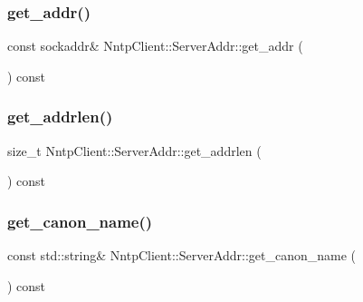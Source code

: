 \subsubsection{\texorpdfstring{get\+\_\+addr()}{get\_addr()}}
{\footnotesize\ttfamily const sockaddr\& Nntp\+Client\+::\+Server\+Addr\+::get\+\_\+addr (\begin{DoxyParamCaption}{ }\end{DoxyParamCaption}) const\hspace{0.3cm}{\ttfamily [inline]}}

\hypertarget{class_nntp_client_1_1_server_addr_ac0737342c3b56311c50e1bf420d82904}{}\label{class_nntp_client_1_1_server_addr_ac0737342c3b56311c50e1bf420d82904} 
\subsubsection{\texorpdfstring{get\+\_\+addrlen()}{get\_addrlen()}}
{\footnotesize\ttfamily size\+\_\+t Nntp\+Client\+::\+Server\+Addr\+::get\+\_\+addrlen (\begin{DoxyParamCaption}{ }\end{DoxyParamCaption}) const\hspace{0.3cm}{\ttfamily [inline]}}

\hypertarget{class_nntp_client_1_1_server_addr_a8b75975f3d475115e4a2c08d325871b4}{}\label{class_nntp_client_1_1_server_addr_a8b75975f3d475115e4a2c08d325871b4} 
\subsubsection{\texorpdfstring{get\+\_\+canon\+\_\+name()}{get\_canon\_name()}}
{\footnotesize\ttfamily const std\+::string\& Nntp\+Client\+::\+Server\+Addr\+::get\+\_\+canon\+\_\+name (\begin{DoxyParamCaption}{ }\end{DoxyParamCaption}) const\hspace{0.3cm}{\ttfamily [inline]}}

\hypertarget{class_nntp_client_1_1_server_addr_a1d1cc29ce2f8c2a0e610bd4836c07f84}{}\label{class_nntp_client_1_1_server_addr_a1d1cc29ce2f8c2a0e610bd4836c07f84} 
